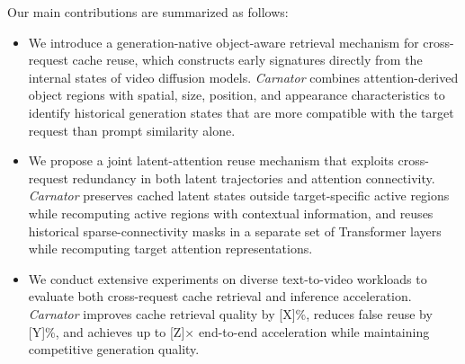 Our main contributions are summarized as follows:
\begin{itemize}[leftmargin=*]
    \item We introduce a generation-native object-aware retrieval mechanism for cross-request cache reuse, which constructs early signatures directly from the internal states of video diffusion models. 
    \emph{Carnator} combines attention-derived object regions with spatial, size, position, and appearance characteristics to identify historical generation states that are more compatible with the target request than prompt similarity alone.

    \item We propose a joint latent-attention reuse mechanism that exploits cross-request redundancy in both latent trajectories and attention connectivity.
    \emph{Carnator} preserves cached latent states outside target-specific active regions while recomputing active regions with contextual information, and reuses historical sparse-connectivity masks in a separate set of Transformer layers while recomputing target attention representations.

    \item We conduct extensive experiments on diverse text-to-video workloads to evaluate both cross-request cache retrieval and inference acceleration.
    \emph{Carnator} improves cache retrieval quality by [X]\%, reduces false reuse by [Y]\%, and achieves up to [Z]$\times$ end-to-end acceleration while maintaining competitive generation quality.
\end{itemize}

